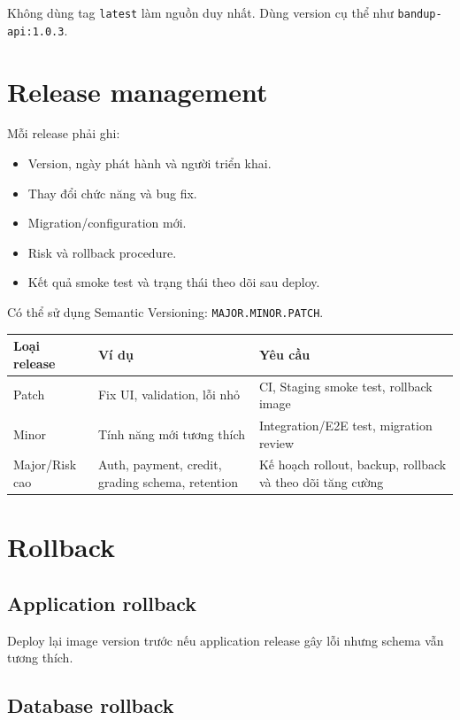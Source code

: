 \documentclass[11pt,a4paper]{article}
\newcommand{\code}[1]{\texttt{#1}}
\begin{document}
Không dùng tag \code{latest} làm nguồn duy nhất. Dùng version cụ thể như \code{bandup-api:1.0.3}.

\section{Release management}

Mỗi release phải ghi:

\begin{itemize}
  \item Version, ngày phát hành và người triển khai.
  \item Thay đổi chức năng và bug fix.
  \item Migration/configuration mới.
  \item Risk và rollback procedure.
  \item Kết quả smoke test và trạng thái theo dõi sau deploy.
\end{itemize}

Có thể sử dụng Semantic Versioning: \code{MAJOR.MINOR.PATCH}.

\begin{longtable}{L{0.20\textwidth}L{0.34\textwidth}L{0.38\textwidth}}
\toprule
\textbf{Loại release} & \textbf{Ví dụ} & \textbf{Yêu cầu} \\
\midrule
Patch & Fix UI, validation, lỗi nhỏ & CI, Staging smoke test, rollback image \\
Minor & Tính năng mới tương thích & Integration/E2E test, migration review \\
Major/Risk cao & Auth, payment, credit, grading schema, retention & Kế hoạch rollout, backup, rollback và theo dõi tăng cường \\
\bottomrule
\end{longtable}

\section{Rollback}

\subsection{Application rollback}

Deploy lại image version trước nếu application release gây lỗi nhưng schema vẫn tương thích.

\subsection{Database rollback}
\end{document}

